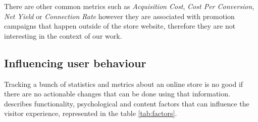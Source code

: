There are other common metrics such as \textit{Acquisition Cost}, \textit{Cost 
Per Conversion}, \textit{Net Yield} or \textit{Connection Rate} however they 
are associated with promotion campaigns that happen outside of the store 
website, therefore they are not interesting in the context of our work.

\subsection{Influencing user behaviour}

Tracking a bunch of statistics and metrics about an online store is no good if 
there are no actionable changes that can be done using that information. 
\cite{Constantinides2004} describes functionality, psychological and content 
factors that can influence the visitor experience, represented in the table 
\ref{tab:factors}.

